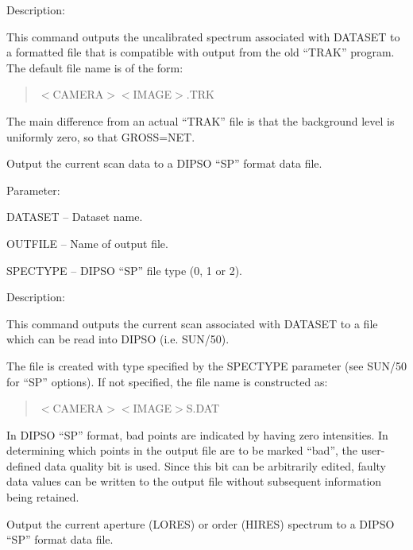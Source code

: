 \begin {description}
\begin {description}
\item Description:

This command outputs the uncalibrated spectrum associated with
DATASET to a formatted file that is compatible with output
from the old ``TRAK'' program.
The default file name is of the form:

\begin {quote}
$<$CAMERA$><$IMAGE$>$.TRK
\end {quote}
The main difference from an actual ``TRAK'' file is that the background
level is uniformly zero, so that GROSS=NET.
\end {description}

\item [OUTSCAN]
Output the current scan data to a DIPSO  ``SP'' format data file.

\begin {description}
\item Parameter:

\begin {description}
\item DATASET -- Dataset name.
\item OUTFILE -- Name of output file.
\item SPECTYPE -- DIPSO ``SP'' file type (0, 1 or 2).
\end {description}

\item Description:

This command outputs the current scan associated with 
DATASET to a file which can be read into DIPSO (i.e. SUN/50).

The file is created with type specified
by the SPECTYPE parameter (see SUN/50 for ``SP'' options).
If not specified, the file name is constructed as:

\begin {quote}
$<$CAMERA$><$IMAGE$>$S.DAT
\end {quote}
In DIPSO ``SP'' format, bad points are indicated by having zero intensities.
In determining which points in the output file are to be marked
``bad'', the user-defined data quality bit is used.
Since this bit can be arbitrarily edited,
faulty data values can be written to the output file 
without subsequent information being retained.
\end {description}

\item [OUTSPEC]
Output the current aperture (LORES) or order (HIRES) spectrum 
to a DIPSO ``SP'' format data file.


\end{description}
